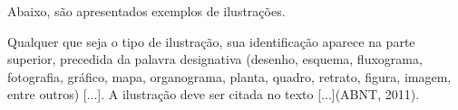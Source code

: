 \documentclass[
  oneside, %
  english,
  brazil
]{abntbibufjf}
\begin{document}

Abaixo, são apresentados exemplos de ilustrações.

Qualquer que seja o tipo de ilustração, sua identificação aparece na parte superior, precedida da palavra designativa (desenho, esquema, fluxograma, fotografia, gráfico, mapa, organograma, planta, quadro, retrato, figura, imagem, entre outros) [...].
A ilustração deve ser citada no texto [...](ABNT, 2011).











\end{document}
